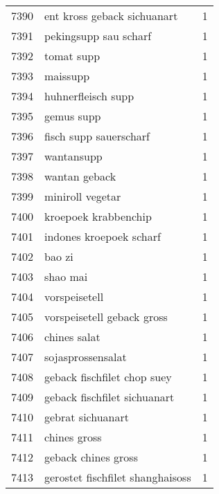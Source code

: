 \begin{tabular}{llr}
7390 &                        ent kross geback sichuanart &      1 \\
7391 &                              pekingsupp sau scharf &      1 \\
7392 &                                         tomat supp &      1 \\
7393 &                                           maissupp &      1 \\
7394 &                                 huhnerfleisch supp &      1 \\
7395 &                                         gemus supp &      1 \\
7396 &                             fisch supp sauerscharf &      1 \\
7397 &                                         wantansupp &      1 \\
7398 &                                      wantan geback &      1 \\
7399 &                                   miniroll vegetar &      1 \\
7400 &                               kroepoek krabbenchip &      1 \\
7401 &                            indones kroepoek scharf &      1 \\
7402 &                                             bao zi &      1 \\
7403 &                                           shao mai &      1 \\
7404 &                                      vorspeisetell &      1 \\
7405 &                         vorspeisetell geback gross &      1 \\
7406 &                                       chines salat &      1 \\
7407 &                                  sojasprossensalat &      1 \\
7408 &                        geback fischfilet chop suey &      1 \\
7409 &                       geback fischfilet sichuanart &      1 \\
7410 &                                  gebrat sichuanart &      1 \\
7411 &                                       chines gross &      1 \\
7412 &                                geback chines gross &      1 \\
7413 &                   gerostet fischfilet shanghaisoss &      1 \\

\end{tabular}
